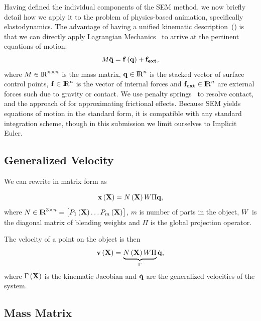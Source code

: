 Having defined the individual components of the SEM method, we now briefly detail how we apply it to the problem of 
physics-based animation, specifically elastodynamics. 
The advantage of having a unified kinematic description~() is that we can directly apply Lagrangian Mechanics~ to arrive at 
the pertinent equations of motion:
\begin{equation*}
    M\ddot{\mathbf{q}} = \mathbf{f}\left(\mathbf{q}\right) + \mathbf{f_{ext}},
\end{equation*} where $M\in{\rm I\!R}^{n\times n}$ is the mass matrix, $\mathbf{q}\in{\rm I\!R}^{n}$ is the stacked vector of surface control points, $\mathbf{f}\in{\rm I\!R}^{n}$ is the 
vector of internal forces and $\mathbf{f_{ext}}\in{\rm I\!R}^{n}$ are external forces such due to gravity or contact. 
We use penalty springs~\cite{10.1145/1964921.1964932} to resolve contact, and the approach of \citet{10.1145/566654.566623} for approximating frictional effects. 
Because SEM yields equations of motion in the standard form, it is compatible with any standard integration scheme, though in this submission we limit ourselves to
Implicit Euler.

\subsection{Generalized Velocity}

We can rewrite  in matrix form as 

\begin{equation}
    \mathbf{x}\left(\mathbf{X}\right) = N\left(\mathbf{X}\right)W\Pi\mathbf{q},
\end{equation} where $N\in{\rm I\!R}^{3\times n} = \begin{bmatrix}P_1\left(\mathbf{X}\right) \dots P_m\left(\mathbf{X}\right)\end{bmatrix}$, $m$ is number of 
parts in the object, $W$ is the diagonal matrix of blending weights and $\Pi$ is the global projection operator.

The velocity of a point on the object is then  
\begin{equation}
        \mathbf{v}\left(\mathbf{X}\right) = \underbrace{N\left(\mathbf{X}\right)W\Pi}_{\Gamma}\dot{\mathbf{q}},
    \end{equation} where $\Gamma\left(\mathbf{X}\right)$ is the kinematic Jacobian and $\dot{\mathbf{q}}$ are the generalized velocities of the system.

\subsection{Mass Matrix}

